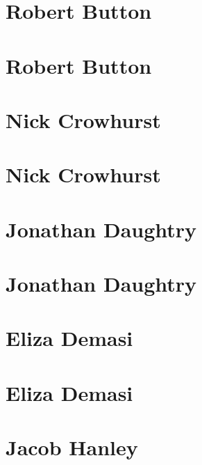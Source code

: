 \documentclass[twoside,14pt,a4paper,notitlepage]{memoir}
\begin{document}
\section*{Robert Button}
\label{aut:button}

\lipsum[1-2]
\section*{Robert Button}
\lipsum[3]



\section*{Nick Crowhurst}
\label{aut:crowhurst}

\lipsum[1-2]
\section*{Nick Crowhurst}
\lipsum[3]



\section*{Jonathan Daughtry}
\label{aut:daughtry}

\lipsum[1-2]
\section*{Jonathan Daughtry}
\lipsum[3]



\section*{Eliza Demasi}
\label{aut:demasi}

\lipsum[1-2]
\section*{Eliza Demasi}
\lipsum[3]



\section*{Jacob Hanley}
\label{aut:hanley}
\end{document}
